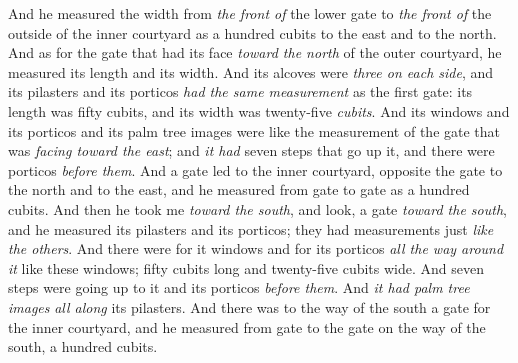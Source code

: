 \begin{biblechapter}
\verse And he measured the width from \textit{the front of} the lower gate to \textit{the front of} the outside of the inner courtyard as a hundred cubits to the east and to the north.
 And as for the gate that had its face \textit{toward the north} of the outer courtyard, he measured its length and its width.
\verse And its alcoves were \textit{three on each side}, and its pilasters and its porticos \textit{had the same measurement} as the first gate: its length was fifty cubits, and its width was twenty-five \textit{cubits}.
\verse And its windows and its porticos and its palm tree images were like the measurement of the gate that was \textit{facing toward the east}; and \textit{it had} seven steps that go up it, and there were porticos \textit{before them}.
\verse And a gate led to the inner courtyard, opposite the gate to the north and to the east, and he measured from gate to gate as a hundred cubits.
 And then he took me \textit{toward the south}, and look, a gate \textit{toward the south}, and he measured its pilasters and its porticos; they had measurements just \textit{like the others}.
\verse And there were for it windows and for its porticos \textit{all the way around it} like these windows; fifty cubits long and twenty-five cubits wide.
\verse And seven steps were going up to it and its porticos \textit{before them}. And \textit{it had palm tree images} \textit{all along} its pilasters.
\verse And there was to the way of the south a gate for the inner courtyard, and he measured from gate to the gate on the way of the south, a hundred cubits.

\end{biblechapter}
